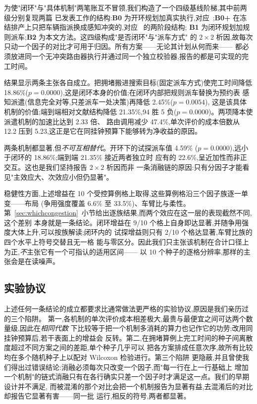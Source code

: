 \documentclass[manuscript,screen,review]{acmart}
\newcommand{\NCases}{10}
\newcommand{\NSeeds}{10}
\newcommand{\GainLoopRule}{18.86\%}      %
\newcommand{\PLoopRule}{0.0000}
\newcommand{\GainProbeOpen}{4.59\%}      %
\newcommand{\PProbeOpen}{0.0000}
\newcommand{\GainProbeLoop}{2.45\%}      %
\newcommand{\PProbeLoop}{0.0054}
\newcommand{\GainEndToEnd}{21.35\%}      %
\newcommand{\PEndToEnd}{0.0000}
\newcommand{\WinEndToEnd}{94}
\newcommand{\LoseEndToEnd}{5}
\newcommand{\GainIndepProduct}{22.6\%}
\newcommand{\CellsSigLoop}{9}
\newcommand{\CellsSigProbe}{2}
\newcommand{\ContentionLo}{6.6\%}
\newcommand{\ContentionHi}{33.5\%}
\newcommand{\SpeedupProbe}{2.33}
\newcommand{\RouteCallCut}{47.4\%}
\newcommand{\CostMultBefore}{12.2}
\newcommand{\CostMultAfter}{5.23}
\begin{document}
为使"闭环"与"具体机制"两笔账互不冒领,我们构造了一个四级基线阶梯,其中前两级分别复现两篇
已发表工作的结构:\textbf{B0} 为开环规划加真实执行,对应~\cite{li2026framework};\textbf{B0+}
在冻结排产上只把车辆指派换成感知冲突的,对应~\cite{sun2023integrated} 的两阶段结构;
\textbf{B1} 为闭环规划加规则派车;\textbf{B2} 为本文方法。这四级构成"是否闭环"与"派车方式"
的 $2\times2$ 析因,故每次只动一个因子的对比才可用于归因。所有方案——无论其计划从何而来——
都必须放进同一个无冲突路由器执行并通过同一个独立校验器,报告的都是可实现的完工时间。

结果显示两条主张各自成立。把拥堵搬进搜索目标(固定派车方式)使完工时间降低
\GainLoopRule{}($p=\PLoopRule$),这是闭环本身的价值;在闭环内部把规则派车替换为预约表
感知派遣(信息完全对等,只差派车一处决策)再降低 \GainProbeLoop{}($p=\PProbeLoop$),
这是该具体机制的价值;端到端相对文献结构降低 \GainEndToEnd{},\WinEndToEnd{} 胜
\LoseEndToEnd{} 负($p=\PEndToEnd$)。两项降本使派遣机制的加速比达到 \SpeedupProbe{} 倍、
路由调用减少 \RouteCallCut{},单次评价的成本倍数从 \CostMultBefore{} 压到
\CostMultAfter{},这正是它在同挂钟预算下能够转为净收益的原因。

两条机制都显著,但\emph{不可互相替代}。开环下的试探派车值 \GainProbeOpen{}
($p=\PProbeOpen$),远小于闭环的 \GainLoopRule{};端到端 \GainEndToEnd{} 接近两者独立时
应有的 \GainIndepProduct{},呈近加性而非正交互。这也是我们坚持报告 $2\times2$ 析因而非
一条消融链的原因:只有分因子才能看见"主效应大、次效应小但仍显著"。

稳健性方面,上述增益在 \NCases{} 个受控算例格上取得,这些算例格沿三个因子族逐一单变——布局
(争用强度覆盖 \ContentionLo{} 至 \ContentionHi{})、车臂比与柔性。
第~\ref{sec:whichcongestion}~小节给出逐族结果,而两个效应在这一层的表现截然不同,这个差别
本身就是一条结论。闭环增益在
\CellsSigLoop{}/\NCases{} 个格上自身即达显著,并随争用强度大体上升,可以按族解读;闭环内的
试探增益则只有 \CellsSigProbe{}/\NCases{} 个格达显著,车臂比族的四个水平上符号交替且无一格
能与零区分。因此我们只主张该机制在合计口径上为正,\emph{不}主张它有一个可指认的适用区间——
以 \NSeeds{} 个种子的逐格分辨率,那样的主张会是在读噪声。

\subsection{实验协议}

上述任何一条结论的成立都要求比通常做法更严格的实验协议,原因是我们亲历过的三个陷阱。
第一,各机制的单次评价成本相差极大,最贵与最便宜之间可达两个数量级,因此在\emph{相同代数}
下比较等于把一个机制多消耗的算力也记作它的功劳;改用同挂钟预算后,若干表面上的增益会
反转。第二,在拥堵算例上完工时间的种子间离散度超过不同方案之间的差距,单个种子几乎可以
把各方案排成任意次序,故所有比较均在多个随机种子上以配对 Wilcoxon 检验进行。第三个陷阱
更隐蔽,并且曾使我们得出过错误结论:消融必须每次只改变一个因子,而"每一行在上一行基础上
增加一个机制"的链式消融只有在各行确实只差一个因子时才满足这一点。我们的早期设计并不满足,
而被混淆的那个对比会把一个机制报告为显著有益,去混淆后的对比却报告它显著有害——同一批
运行,相反的符号,两者都显著。
\end{document}

